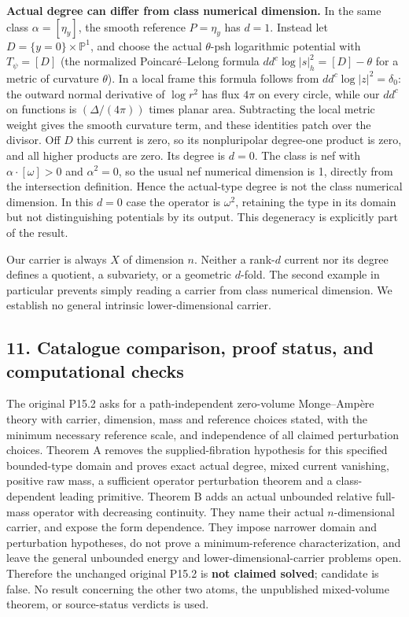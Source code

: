 \documentclass[
  10pt,
]{article}
\begin{document}
\textbf{Actual degree can differ from class numerical dimension.} In the
same class \(\alpha=[\eta_y]\), the smooth reference \(P=\eta_y\) has
\(d=1\). Instead let \(D=\{y=0\}\times\mathbb{P}^1\), and choose the
actual \(\theta\)-psh logarithmic potential with \(T_\psi=[D]\) (the
normalized Poincaré--Lelong formula \(dd^c\log|s|_h^2=[D]-\theta\) for a
metric of curvature \(\theta\)). In a local frame this formula follows
from \(dd^c\log|z|^2=\delta_0\): the outward normal derivative of
\(\log r^2\) has flux \(4\pi\) on every circle, while our \(dd^c\) on
functions is \((\Delta/(4\pi))\) times planar area. Subtracting the
local metric weight gives the smooth curvature term, and these
identities patch over the divisor. Off \(D\) this current is zero, so
its nonpluripolar degree-one product is zero, and all higher products
are zero. Its degree is \(d=0\). The class is nef with
\(\alpha\cdot[\omega]>0\) and \(\alpha^2=0\), so the usual nef numerical
dimension is 1, directly from the intersection definition. Hence the
actual-type degree is not the class numerical dimension. In this \(d=0\)
case the operator is \(\omega^2\), retaining the type in its domain but
not distinguishing potentials by its output. This degeneracy is
explicitly part of the result.

Our carrier is always \(X\) of dimension \(n\). Neither a rank-\(d\)
current nor its degree defines a quotient, a subvariety, or a geometric
\(d\)-fold. The second example in particular prevents simply reading a
carrier from class numerical dimension. We establish no general
intrinsic lower-dimensional carrier.

\subsection{11. Catalogue comparison, proof status, and computational
checks}\label{catalogue-comparison-proof-status-and-computational-checks}

The original P15.2 asks for a path-independent zero-volume Monge--Ampère
theory with carrier, dimension, mass and reference choices stated, with
the minimum necessary reference scale, and independence of all claimed
perturbation choices. Theorem A removes the supplied-fibration
hypothesis for this specified bounded-type domain and proves exact
actual degree, mixed current vanishing, positive raw mass, a sufficient
operator perturbation theorem and a class-dependent leading primitive.
Theorem B adds an actual unbounded relative full-mass operator with
decreasing continuity. They name their actual \(n\)-dimensional carrier,
and expose the form dependence. They impose narrower domain and
perturbation hypotheses, do not prove a minimum-reference
characterization, and leave the general unbounded energy and
lower-dimensional-carrier problems open. Therefore the unchanged
original P15.2 is \textbf{not claimed solved}; candidate is false. No
result concerning the other two atoms, the unpublished mixed-volume
theorem, or source-status verdicts is used.
\end{document}
